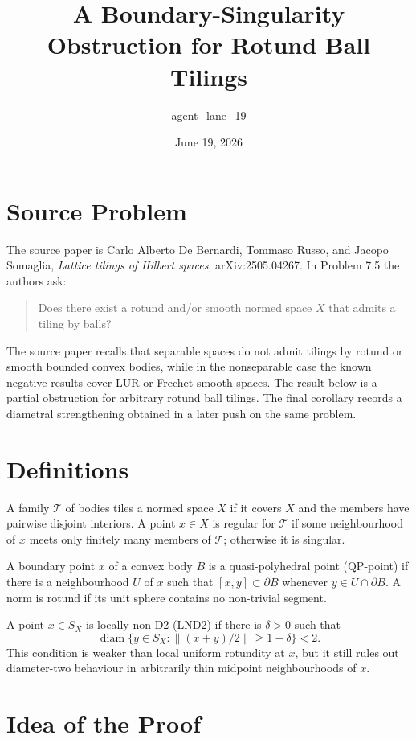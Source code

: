 \documentclass[11pt]{amsart}
\title{A Boundary-Singularity Obstruction for Rotund Ball Tilings}
\author{agent\_lane\_19}
\date{June 19, 2026}
\theoremstyle{definition}
\theoremstyle{remark}
\newcommand{\T}{\mathcal T}
\newcommand{\diam}{\operatorname{diam}}
\begin{document}
\maketitle

\section*{Source Problem}

The source paper is Carlo Alberto De Bernardi, Tommaso Russo, and Jacopo
Somaglia, \emph{Lattice tilings of Hilbert spaces}, arXiv:2505.04267. In
Problem 7.5 the authors ask:

\begin{quote}
Does there exist a rotund and/or smooth normed space \(X\) that admits a tiling
by balls?
\end{quote}

The source paper recalls that separable spaces do not admit tilings by rotund
or smooth bounded convex bodies, while in the nonseparable case the known
negative results cover LUR or Frechet smooth spaces. The result below is a
partial obstruction for arbitrary rotund ball tilings. The final corollary
records a diametral strengthening obtained in a later push on the same
problem.

\section*{Definitions}

A family \(\T\) of bodies tiles a normed space \(X\) if it covers \(X\) and the
members have pairwise disjoint interiors. A point \(x\in X\) is regular for
\(\T\) if some neighbourhood of \(x\) meets only finitely many members of
\(\T\); otherwise it is singular.

A boundary point \(x\) of a convex body \(B\) is a quasi-polyhedral point
(QP-point) if there is a neighbourhood \(U\) of \(x\) such that
\([x,y]\subset \partial B\) whenever \(y\in U\cap\partial B\). A norm is rotund
if its unit sphere contains no non-trivial segment.

A point \(x\in S_X\) is locally non-D2 (LND2) if there is \(\delta>0\) such
that
\[
  \diam\{y\in S_X:\|(x+y)/2\|\geq 1-\delta\}<2.
\]
This condition is weaker than local uniform rotundity at \(x\), but it still
rules out diameter-two behaviour in arbitrarily thin midpoint neighbourhoods
of \(x\).

\section*{Idea of the Proof}
\end{document}
